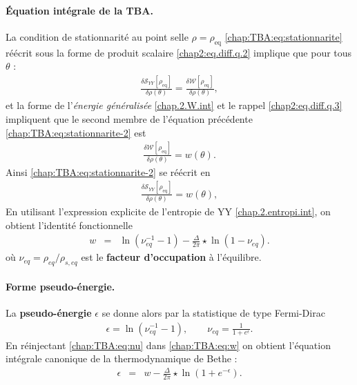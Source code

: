 \paragraph{Équation intégrale de la \gls{TBA}.}
La condition de stationnarité au point selle \(\rho=\rho_{\mathrm{eq}}\) \eqref{chap:TBA:eq:stationnarite} réécrit sous la forme de produit scalaire \eqref{chap2:eq.diff.q.2} implique que pour tous $\theta$ :
\begin{eqnarray}\label{chap:TBA:eq:stationnarite-2}
	\frac{\delta\mathcal{S}_{YY}[\rho_{\mathrm{eq}}]}{\delta\rho(\theta)} = \frac{\delta\mathcal{W}[\rho_{\mathrm{eq}}]}{\delta\rho(\theta)},
\end{eqnarray}
et la forme de l'{\em énergie généralisée} \eqref{chap.2.W.int} et le rappel \eqref{chap2:eq.diff.q.3} impliquent que le second membre de l'équation précédente \eqref{chap:TBA:eq:stationnarite-2} est 
\begin{eqnarray}
	\frac{\delta\mathcal{W}[\rho_{\mathrm{eq}}]}{\delta\rho(\theta)}  = w(\theta).
\end{eqnarray}	
Ainsi \eqref{chap:TBA:eq:stationnarite-2} se réécrit en 
\begin{eqnarray}
	\frac{\delta\mathcal{S}_{YY}[\rho_{\mathrm{eq}}]}{\delta\rho(\theta)} = w(\theta),\label{chap:TBA:eq:stationnarite-3}
\end{eqnarray}
En utilisant l’expression explicite de l’entropie de \gls{YY} \eqref{chap.2.entropi.int}, on obtient l’identité fonctionnelle
\begin{eqnarray}
	w & = & \ln ( \nu_{\!eq}^{-1}  - 1 ) - \frac{\Delta}{2\pi} \star \ln ( 1 -  \nu_{\!eq}).\label{chap:TBA:eq:w}
\end{eqnarray}
où
\(
\nu_{\!eq}=\rho_{\!eq}/\rho_{s,\!eq}
\)
est le \textbf{facteur d’occupation} à l’équilibre.
\paragraph{Forme pseudo-énergie.}
La \textbf{pseudo-énergie} $\epsilon$ se donne alors par la statistique de type Fermi-Dirac
\begin{eqnarray}
	\epsilon =\ln(\nu^{-1}_{\!eq}-1),\qquad\nu_{\!eq}=\frac{1}{1+e^{\epsilon}}.\label{chap:TBA:eq:nu}%
\end{eqnarray}
En réinjectant \eqref{chap:TBA:eq:nu} dans \eqref{chap:TBA:eq:w} on obtient
l’équation intégrale canonique de la thermodynamique de Bethe :
\begin{eqnarray}
	\epsilon & = & w - \frac{\Delta}{2\pi} \star \ln ( 1  + e^{-\epsilon}).\label{chap:TBA:eq:e}%
\end{eqnarray}

